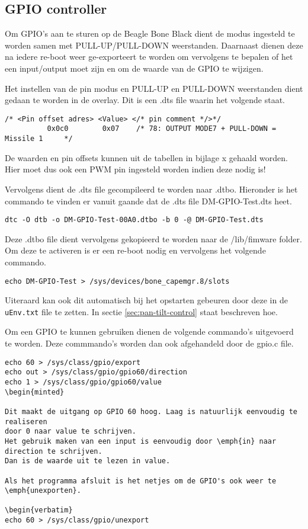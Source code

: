 \subsection{GPIO controller}
\label{sec:gpio}

Om GPIO's aan te sturen op de Beagle Bone Black dient de modus ingesteld te worden
samen met PULL-UP/PULL-DOWN weerstanden. Daarnaast dienen deze na iedere re-boot
weer ge-exporteert te worden om vervolgens te bepalen of het een input/output moet
zijn en om de waarde van de GPIO te wijzigen.

Het instellen van de pin modus en PULL-UP en PULL-DOWN weerstanden dient gedaan te
worden in de overlay. Dit is een .dts file waarin het volgende staat.

\begin{verbatim}
/* <Pin offset adres> <Value> </* pin comment */>*/
          0x0c0        0x07    /* 78: OUTPUT MODE7 + PULL-DOWN = Missile 1     */
\end{verbatim}

De waarden en pin offsets kunnen uit de tabellen in bijlage x gehaald worden. Hier
moet dus ook een PWM pin ingesteld worden indien deze nodig is!

Vervolgens dient de .dts file gecompileerd te worden naar .dtbo. Hieronder is het
commando te vinden er vanuit gaande dat de .dts file DM-GPIO-Test.dts heet.

\begin{verbatim}
dtc -O dtb -o DM-GPIO-Test-00A0.dtbo -b 0 -@ DM-GPIO-Test.dts
\end{verbatim}

Deze .dtbo file dient vervolgens gekopieerd te worden naar de /lib/fimware folder.
Om deze te activeren is er een re-boot nodig en vervolgens het volgende commando.

\begin{verbatim}
echo DM-GPIO-Test > /sys/devices/bone_capemgr.8/slots
\end{verbatim}

Uiteraard kan ook dit automatisch bij het opstarten gebeuren door deze in de
\texttt{uEnv.txt} file te zetten. In sectie \ref{sec:pan-tilt-control} staat
beschreven hoe.

Om een GPIO te kunnen gebruiken dienen de volgende commando's uitgevoerd te worden.
Deze commmando's worden dan ook afgehandeld door de gpio.c file.

\begin{verbatim}
echo 60 > /sys/class/gpio/export
echo out > /sys/class/gpio/gpio60/direction
echo 1 > /sys/class/gpio/gpio60/value
\begin{minted}

Dit maakt de uitgang op GPIO 60 hoog. Laag is natuurlijk eenvoudig te realiseren
door 0 naar value te schrijven.
Het gebruik maken van een input is eenvoudig door \emph{in} naar direction te schrijven.
Dan is de waarde uit te lezen in value.

Als het programma afsluit is het netjes om de GPIO's ook weer te \emph{unexporten}.

\begin{verbatim}
echo 60 > /sys/class/gpio/unexport
\end{verbatim}

